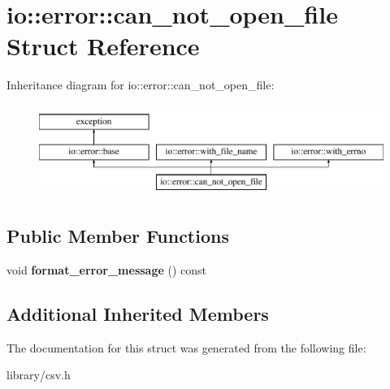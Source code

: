 \hypertarget{structio_1_1error_1_1can__not__open__file}{}\section{io\+:\+:error\+:\+:can\+\_\+not\+\_\+open\+\_\+file Struct Reference}
\label{structio_1_1error_1_1can__not__open__file}
Inheritance diagram for io\+:\+:error\+:\+:can\+\_\+not\+\_\+open\+\_\+file\+:\begin{figure}[H]
\begin{center}
\leavevmode
\includegraphics[height=3.000000cm]{structio_1_1error_1_1can__not__open__file}
\end{center}
\end{figure}
\subsection*{Public Member Functions}
\begin{DoxyCompactItemize}
\item 
\mbox{\label{structio_1_1error_1_1can__not__open__file_a0249122edaf123e9fa4baabe8128806c}} 
void {\bfseries format\+\_\+error\+\_\+message} () const
\end{DoxyCompactItemize}
\subsection*{Additional Inherited Members}


The documentation for this struct was generated from the following file\+:\begin{DoxyCompactItemize}
\item 
library/csv.\+h\end{DoxyCompactItemize}
